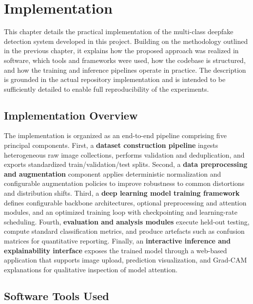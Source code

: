 \chapter{Implementation}
\label{chap:implementation}

This chapter details the practical implementation of the multi-class deepfake detection system developed in this project. Building on the methodology outlined in the previous chapter, it explains how the proposed approach was realized in software, which tools and frameworks were used, how the codebase is structured, and how the training and inference pipelines operate in practice. The description is grounded in the actual repository implementation and is intended to be sufficiently detailed to enable full reproducibility of the experiments.

\section{Implementation Overview}
\label{sec:implementation-overview}

The implementation is organized as an end-to-end pipeline comprising five principal components. First, a \textbf{dataset construction pipeline} ingests heterogeneous raw image collections, performs validation and deduplication, and exports standardized train/validation/test splits. Second, a \textbf{data preprocessing and augmentation} component applies deterministic normalization and configurable augmentation policies to improve robustness to common distortions and distribution shifts. Third, a \textbf{deep learning model training framework} defines configurable backbone architectures, optional preprocessing and attention modules, and an optimized training loop with checkpointing and learning-rate scheduling. Fourth, \textbf{evaluation and analysis modules} execute held-out testing, compute standard classification metrics, and produce artefacts such as confusion matrices for quantitative reporting. Finally, an \textbf{interactive inference and explainability interface} exposes the trained model through a web-based application that supports image upload, prediction visualization, and Grad-CAM explanations for qualitative inspection of model attention.

\section{Software Tools Used}
\label{sec:software-tools}

